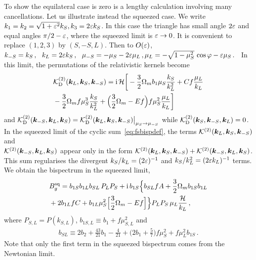 To show the equilateral case is zero is a lengthy calculation involving many cancellations.  Let us illustrate instead the squeezed case. We write $k_1=k_2=\sqrt{1+\varepsilon^2}k_S, k_3=2\varepsilon k_S$.
In this case the triangle has small angle $2\varepsilon$ and equal angles $\pi/2-\varepsilon$, where the squeezed limit is $\varepsilon\to0$. It is convenient to replace $(1,2,3)$ by $(S,-S,L)$.
Then to $O(\varepsilon)$,
$%
k_{-S}= k_{S}\,,~~k_L=2\ep k_S\,,~~  
\mu_{-S}=-\mu_S-2\ep\mu_L\,,
\mu_L = -\sqrt{1-\mu_S^2}\,\cos\varphi - {\ep\mu_S}\,.
$%
 ~In this limit, the permutations of the relativistic kernels become
\begin{align}
& {\cal K}^{(2)}_{\mathrm{D}}(\bm {k}_L,\bm {k}_S,\bm {k}_{-S}) = \mathrm{i\,} {\mathcal{H}}
{\bigg[- \frac{3}{2}\Omega_m b_1\mu_S \frac{k_S}{k_L^2}+ C f \frac{\mu_L}{k_L} }
\nonumber\\
& - \frac{3}{2} \Omega_m f\mu_S^3 \frac{k_S}{k_L^2} +\Big( \frac{3}{2} \Omega_m- Ef \Big) f\mu_S^2 \frac{\mu_L}{k_L}\bigg] 
\label{k2d1} 
\end{align}
and $ {\cal K}^{(2)}_{\mathrm{D}}(\bm {k}_{-S},\bm {k}_L,\bm {k}_S) =  {\cal K}^{(2)}_{\mathrm{D}}(\bm {k}_L,\bm {k}_S,\bm {k}_{-S})\big|_{\mu_S\to {\mu_{-S}}}$ while ${\cal K}^{(2)}_{\mathrm{D}}(\bm {k}_S,\bm {k}_{-S},\bm {k}_L) =0$. 
In the squeezed limit of the cyclic sum~\eqref{eq:fsbispdef}, the terms $\mathcal{K}^{(2)}(\bm {k}_L,\bm {k}_S,\bm {k}_{-S})$ and \\ $\mathcal{K}^{(2)}(\bm {k}_{-S},\bm {k}_L,\bm {k}_S)$ appear only in the form ${\cal K}^{(2)}(\bm {k}_L,\bm {k}_S,\bm {k}_{-S})+{\cal K}^{(2)}(\bm {k}_{-S},\bm {k}_L,\bm {k}_S)$. This sum regularises the divergent $k_S/k_L=(2\varepsilon)^{-1}$ and $k_S/k_L^2=(2\varepsilon k_L)^{-1}$ terms.  We obtain the bispectrum in the squeezed limit,
\begin{align}
&B_{g}^{\mathrm{sq}} = b_{1S}b_{1L}b_{SL}\, P_LP_S+\mathrm{i\,} b_{1S}\Big\{b_{SL}f A + {\frac{3}{2}} \Omega_m b_{1S}b_{1L} 
\nonumber\\
&+2b_{1L}f C+ b_{1L}\mu_S^2\Big[{\frac{3}{2}}\Omega_m- Ef \Big] \Big\}P_LP_S\,\mu_L \frac{\mathcal{H}}{k_L} \,,\label{bgd}
\end{align}
where $P_{S,L}=P(k_{S,L})$, $b_{1S,L}\equiv  b_1+f\mu_{S,L}^2$ and
\begin{align}
b_{SL} \equiv 2b_2+ \frac{43}{21}b_1 - \frac{4}{21}
+\Big(2b_1+ \frac{5}{7}\Big)f\mu_S^2%
+f\mu_L^2 b_{1S}
\,. \label{bsl}
\end{align}
Note that only the first term in the squeezed bispectrum comes from the Newtonian limit. 

